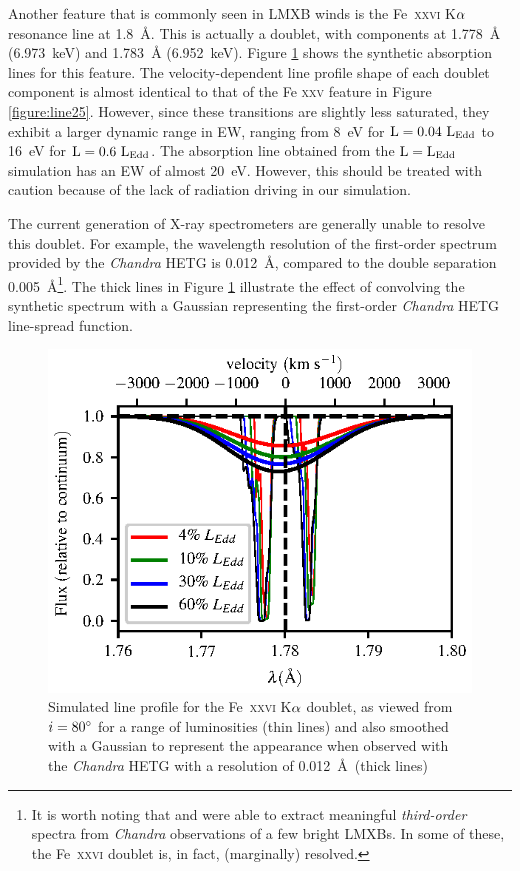 \documentclass[a4paper,fleqn,usenatbib]{mnras}
\begin{document}
Another feature that is commonly seen in LMXB winds is the
Fe~\textsc{xxvi} K$\rm{\alpha}$ resonance line at 1.8~{\AA}. This
is actually a doublet, with components at 1.778~{\AA} (6.973~keV) and
1.783~{\AA} (6.952~keV). Figure \ref{figure:line26_smooth} shows the synthetic
absorption lines for this feature. The velocity-dependent
line profile shape of each doublet component is almost identical to
that of the Fe \textsc{xxv} feature in Figure
\ref{figure:line25}. However, since these transitions are slightly less
saturated, they exhibit a larger dynamic range in EW, ranging from
8~eV for $\rm{L = 0.04~L_{Edd}}$ to 16~eV for $\rm{L = 0.6~L_{Edd}}$.
The absorption line obtained from the $\rm{L = L_{Edd}}$ simulation
has an EW of almost 20~eV. However, this should be treated with
caution because of the lack of radiation driving in our simulation.

The current generation of X-ray spectrometers are generally unable
to resolve this doublet. For example, the wavelength resolution of the
first-order spectrum provided by the \emph{Chandra} HETG is
0.012~\AA, compared to the double separation 0.005~\AA\footnote{It is worth noting that
\citep{2015ApJ...814...87M} and \cite{2016ApJ...821L...9M} were able
to extract meaningful {\em third-order} spectra from \emph{Chandra}
observations of a few bright LMXBs. In some of these, the
Fe~\textsc{xxvi} doublet is, in fact, (marginally) resolved.}.
The thick lines in Figure 
\ref{figure:line26_smooth} illustrate the effect of convolving the
synthetic spectrum with a Gaussian representing the first-order \emph{Chandra}
HETG line-spread function.


\begin{figure}
\includegraphics[width=\columnwidth]{figures/fig6_80_degrees_fe26_smooth.eps}
\caption{Simulated line profile for the Fe~\textsc{xxvi} K$\rm{\alpha}$
doublet, as viewed from $i = 80\degree$ for a range
of luminosities (thin lines) and also smoothed with a Gaussian to represent the appearance when
observed with the \emph{Chandra} HETG with a resolution of 0.012~\AA~(thick lines)}
\label{figure:line26_smooth}
\end{figure}
\end{document}
